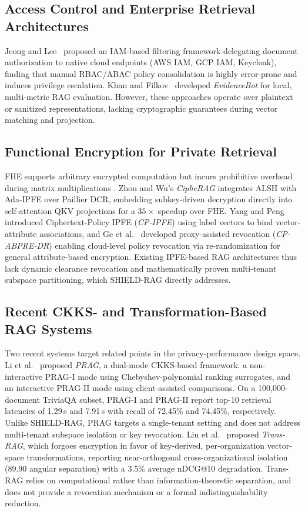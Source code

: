 \documentclass[10pt,a4paper]{article}
\begin{document}
\subsection{Access Control and Enterprise Retrieval Architectures}
Jeong and Lee~\cite{jeong2025permissionaware} proposed an IAM-based filtering framework delegating document authorization to native cloud endpoints (AWS IAM, GCP IAM, Keycloak), finding that manual RBAC/ABAC policy consolidation is highly error-prone and induces privilege escalation. Khan and Filkov~\cite{khan2025evidencebot} developed \textit{EvidenceBot} for local, multi-metric RAG evaluation. However, these approaches operate over plaintext or sanitized representations, lacking cryptographic guarantees during vector matching and projection.

\subsection{Functional Encryption for Private Retrieval}
FHE \cite{gentry2009fhe} supports arbitrary encrypted computation but incurs prohibitive overhead during matrix multiplications \cite{hou2026ciphergpt}. Zhou and Wu's \textit{CipheRAG} \cite{zhou2026cipherag} integrates ALSH \cite{shrivastava2014alsh} with Ada-IPFE \cite{yang2022privacypreserving} over Paillier DCR, embedding subkey-driven decryption directly into self-attention QKV projections for a $35\times$ speedup over FHE. Yang and Peng~\cite{yang2024cpipfe} introduced Ciphertext-Policy IPFE (\textit{CP-IPFE}) using label vectors to bind vector-attribute associations, and Ge et al.~\cite{ge2024attributebased} developed proxy-assisted revocation (\textit{CP-ABPRE-DR}) enabling cloud-level policy revocation via re-randomization for general attribute-based encryption. Existing IPFE-based RAG architectures thus lack dynamic clearance revocation and mathematically proven multi-tenant subspace partitioning, which SHIELD-RAG directly addresses.

\subsection{Recent CKKS- and Transformation-Based RAG Systems}
Two recent systems target related points in the privacy-performance design space. Li et al.~\cite{li2026prag} proposed \textit{PRAG}, a dual-mode CKKS-based framework: a non-interactive PRAG-I mode using Chebyshev-polynomial ranking surrogates, and an interactive PRAG-II mode using client-assisted comparisons. On a 100,000-document TriviaQA subset, PRAG-I and PRAG-II report top-10 retrieval latencies of 1.29\,s and 7.91\,s with recall of 72.45\% and 74.45\%, respectively. Unlike SHIELD-RAG, PRAG targets a single-tenant setting and does not address multi-tenant subspace isolation or key revocation. Liu et al.~\cite{liu2026transrag} proposed \textit{Trans-RAG}, which forgoes encryption in favor of key-derived, per-organization vector-space transformations, reporting near-orthogonal cross-organizational isolation (89.90\textdegree{} angular separation) with a 3.5\% average nDCG@10 degradation. Trans-RAG relies on computational rather than information-theoretic separation, and does not provide a revocation mechanism or a formal indistinguishability reduction.
\end{document}
